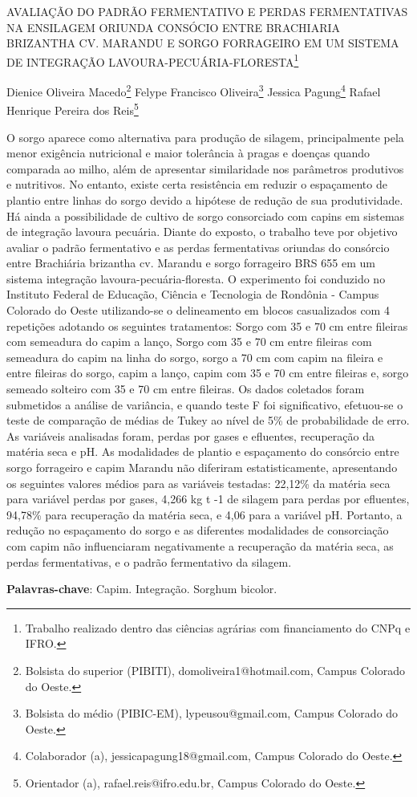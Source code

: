\documentclass[article,12pt,onesidea,4paper,english,brazil]{abntex2}
\begin{document}
	
	
	\frenchspacing 
	
	\begin{center}
		\LARGE AVALIAÇÃO DO PADRÃO FERMENTATIVO E PERDAS FERMENTATIVAS NA
		ENSILAGEM ORIUNDA CONSÓCIO ENTRE BRACHIARIA BRIZANTHA CV.
		MARANDU E SORGO FORRAGEIRO EM UM SISTEMA DE INTEGRAÇÃO LAVOURA-PECUÁRIA-FLORESTA\footnote{Trabalho realizado dentro das ciências agrárias com financiamento do CNPq e IFRO.}
		
		\normalsize
		Dienice Oliveira Macedo\footnote{Bolsista do superior (PIBITI), domoliveira1@hotmail.com, Campus Colorado do Oeste.} 
		Felype Francisco Oliveira\footnote{Bolsista do médio (PIBIC-EM), lypeusou@gmail.com, Campus Colorado do Oeste.} 
		Jessica Pagung\footnote{Colaborador (a), jessicapagung18@gmail.com, Campus Colorado do Oeste.} 
		Rafael Henrique Pereira dos
		Reis\footnote{Orientador (a), rafael.reis@ifro.edu.br, Campus Colorado do Oeste.} 
	\end{center}
	
	\noindent O sorgo aparece como alternativa para produção de silagem, principalmente pela
	menor exigência nutricional e maior tolerância à pragas e doenças quando
	comparada ao milho, além de apresentar similaridade nos parâmetros produtivos e
	nutritivos. No entanto, existe certa resistência em reduzir o espaçamento de plantio
	entre linhas do sorgo devido a hipótese de redução de sua produtividade. Há ainda a
	possibilidade de cultivo de sorgo consorciado com capins em sistemas de integração
	lavoura pecuária. Diante do exposto, o trabalho teve por objetivo avaliar o padrão
	fermentativo e as perdas fermentativas oriundas do consórcio entre Brachiária
	brizantha cv. Marandu e sorgo forrageiro BRS 655 em um sistema integração
	lavoura-pecuária-floresta. O experimento foi conduzido no Instituto Federal de
	Educação, Ciência e Tecnologia de Rondônia - Campus Colorado do Oeste
	utilizando-se o delineamento em blocos casualizados com 4 repetições adotando os
	seguintes tratamentos: Sorgo com 35 e 70 cm entre fileiras com semeadura do
	capim a lanço, Sorgo com 35 e 70 cm entre fileiras com semeadura do capim na
	linha do sorgo, sorgo a 70 cm com capim na fileira e entre fileiras do sorgo, capim a
	lanço, capim com 35 e 70 cm entre fileiras e, sorgo semeado solteiro com 35 e 70
	cm entre fileiras. Os dados coletados foram submetidos a análise de variância, e
	quando teste F foi significativo, efetuou-se o teste de comparação de médias de
	Tukey ao nível de 5\% de probabilidade de erro. As variáveis analisadas foram,
	perdas por gases e efluentes, recuperação da matéria seca e pH. As modalidades
	de plantio e espaçamento do consórcio entre sorgo forrageiro e capim Marandu não
	diferiram estatisticamente, apresentando os seguintes valores médios para as
	variáveis testadas: 22,12\% da matéria seca para variável perdas por gases, 4,266 kg
	t
	-1 de silagem para perdas por efluentes, 94,78\% para recuperação da matéria seca,
	e 4,06 para a variável pH. Portanto, a redução no espaçamento do sorgo e as
	diferentes modalidades de consorciação com capim não influenciaram
	negativamente a recuperação da matéria seca, as perdas fermentativas, e o padrão
	fermentativo da silagem.
	
	\vspace{\onelineskip}
	
	\noindent
	\textbf{Palavras-chave}: Capim. Integração. Sorghum bicolor.
	
\end{document}
